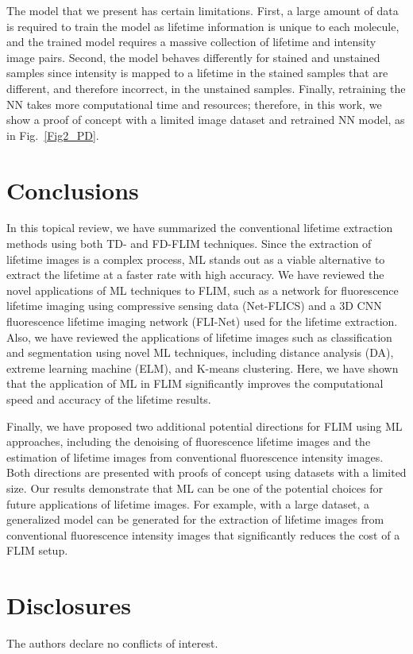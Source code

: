 \documentclass[12pt]{iopart}
\begin{document}
The model that we present has certain limitations. First, a large amount of data is required to train the model as lifetime information is unique to each molecule, and the trained model requires a massive collection of lifetime and intensity image pairs. Second, the model behaves differently for stained and unstained samples since intensity is mapped to a lifetime in the stained samples that are different, and therefore incorrect, in the unstained samples. Finally, retraining the NN takes more computational time and resources; therefore, in this work, we show a proof of concept with a limited image dataset and retrained NN model, as in Fig.~\ref{Fig2_PD}.

\section{Conclusions}
In this topical review, we have summarized the conventional lifetime extraction methods using both TD- and FD-FLIM techniques. Since the extraction of lifetime images is a complex process, ML stands out as a viable alternative to extract the lifetime at a faster rate with high accuracy. We have reviewed the novel applications of ML techniques to FLIM, such as a network for fluorescence lifetime imaging using compressive sensing data (Net-FLICS) and a 3D CNN fluorescence lifetime imaging network (FLI-Net) used for the lifetime extraction. Also, we have reviewed the applications of lifetime images such as classification and segmentation using novel ML techniques, including distance analysis (DA), extreme learning machine (ELM), and K-means clustering. Here, we have shown that the application of ML in FLIM significantly improves the computational speed and accuracy of the lifetime results.

Finally, we have proposed two additional potential directions for FLIM using ML approaches, including the denoising of fluorescence lifetime images and the estimation of lifetime images from conventional fluorescence intensity images. Both directions are presented with proofs of concept using datasets with a limited size. Our results demonstrate that ML can be one of the potential choices for future applications of lifetime images. For example, with a large dataset, a generalized model can be generated for the extraction of lifetime images from conventional fluorescence intensity images that significantly reduces the cost of a FLIM setup.

\section*{Disclosures}
\noindent The authors declare no conflicts of interest.
\end{document}
